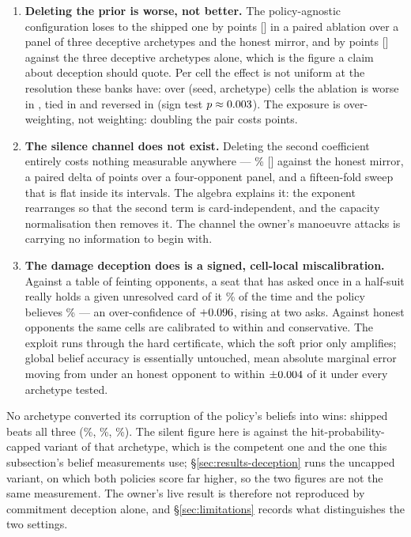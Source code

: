 \begin{enumerate}
  \item \textbf{Deleting the prior is worse, not better.} The policy-agnostic
        configuration loses to the shipped one by \numAgnosticCost{} points
        [\numAgnosticCI] in a paired ablation over a panel of three deceptive
        archetypes and the honest mirror, and by \numPriorDeleteCost{} points
        [\numPriorDeleteCI] against the three deceptive archetypes alone, which
        is the figure a claim about deception should quote. Per cell the effect
        is not uniform at the resolution these banks have: over
        \numPriorCells{} (seed, archetype) cells the ablation is worse in
        \numPriorCellsWorse{}, tied in \numPriorCellsTie{} and reversed in
        \numPriorCellsReversed{} (sign test $p \approx 0.003$).
        The exposure is over-weighting, not weighting: doubling the pair costs
        \numPriorDoubleCost{} points.
  \item \textbf{The silence channel does not exist.} Deleting the second
        coefficient entirely costs nothing measurable anywhere ---
        \numPhiWin\% [\numPhiCI] against the honest mirror, a paired delta of
        \numPhiPaired{} points over a four-opponent panel, and a fifteen-fold
        sweep that is flat inside its intervals. The algebra explains it: the
        exponent rearranges so that the second term is card-independent, and the
        capacity normalisation then removes it. The channel the owner's manoeuvre
        attacks is carrying no information to begin with.
  \item \textbf{The damage deception does is a signed, cell-local
        miscalibration.} Against a table of feinting opponents, a seat that has
        asked once in a half-suit really holds a given unresolved card of it
        \numFeintTrue\% of the time and the policy believes \numFeintBelief\% ---
        an over-confidence of $+0.096$, rising at two asks. Against
        honest opponents the same cells are calibrated to within \numFeintCalib{} and
        conservative. The exploit runs through the hard certificate, which the
        soft prior only amplifies; global belief accuracy is essentially
        untouched, mean absolute marginal error moving from \numBeliefErrHonest{}
        under an honest opponent to within $\pm0.004$ of it under every archetype
        tested.
\end{enumerate}

No archetype converted its corruption of the policy's beliefs into wins: shipped
\vfour{} beats all three (\numVsFeint\%, \numVsSilent\%, \numVsWithholder\%).
The silent figure here is against the hit-probability-capped variant of that
archetype, which is the competent one and the one this subsection's belief
measurements use; \S\ref{sec:results-deception} runs the uncapped variant, on
which both policies score far higher, so the two figures are not the same
measurement. The
owner's live result is therefore not reproduced by commitment deception alone,
and \S\ref{sec:limitations} records what distinguishes the two settings.

